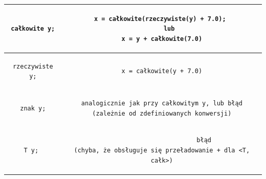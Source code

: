 \begin{center}
  \label{tab:title} 
\begin{tabular}{|c|c|}
\hline
\begin{lstlisting}
całkowite y;
\end{lstlisting}
&
\begin{lstlisting}
x = całkowite(rzeczywiste(y) + 7.0); 
    lub
x = y + całkowite(7.0)
\end{lstlisting}
 \\ \hline

\begin{lstlisting}
rzeczywiste y;
\end{lstlisting}
&
\begin{lstlisting}
x = całkowite(y + 7.0)
\end{lstlisting}
 \\ \hline

\begin{lstlisting}
znak y;
\end{lstlisting}
&
\begin{lstlisting}
analogicznie jak przy całkowitym y, lub błąd
(zależnie od zdefiniowanych konwersji)
\end{lstlisting}
 \\ \hline

\begin{lstlisting}
T y; 
\end{lstlisting}
&
\lstset{
    escapechar=|,
    breaklines=true
}
\begin{lstlisting}
                        błąd 
(chyba, że obsługuje się przeładowanie + dla <T, całk>)
\end{lstlisting}
 \\ \hline

 
\end{tabular}
\end{center}

                
